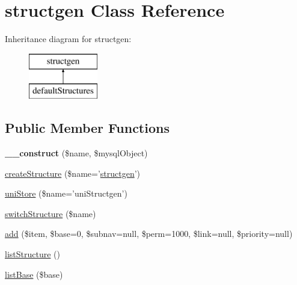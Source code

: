 \hypertarget{classstructgen}{\section{structgen Class Reference}
\label{classstructgen}
}
Inheritance diagram for structgen\-:\begin{figure}[H]
\begin{center}
\leavevmode
\includegraphics[height=2.000000cm]{classstructgen}
\end{center}
\end{figure}
\subsection*{Public Member Functions}
\begin{DoxyCompactItemize}
\item 
\hypertarget{classstructgen_a36878ba6be584b5b676f7bd98af20ee9}{{\bfseries \-\_\-\-\_\-construct} (\$name, \$mysql\-Object)}\label{classstructgen_a36878ba6be584b5b676f7bd98af20ee9}

\item 
\hyperlink{classstructgen_a92f20c16db5c95fbd705777feacf8125}{create\-Structure} (\$name='\hyperlink{classstructgen}{structgen}')
\item 
\hyperlink{classstructgen_ade4889cf904248b04ad83fbe2f2e74f9}{uni\-Store} (\$name='uni\-Structgen')
\item 
\hyperlink{classstructgen_a9ad9f4819f4914c8f0af701c5d5832e4}{switch\-Structure} (\$name)
\item 
\hyperlink{classstructgen_a68faa951ece5c70b42a9782bcfa3590a}{add} (\$item, \$base=0, \$subnav=null, \$perm=1000, \$link=null, \$priority=null)
\item 
\hyperlink{classstructgen_abe862044c4d94459740b5b6563a4f870}{list\-Structure} ()
\item 
\hyperlink{classstructgen_ad1e438322f50cf6f9cf6025c76ded250}{list\-Base} (\$base)
\end{DoxyCompactItemize}
